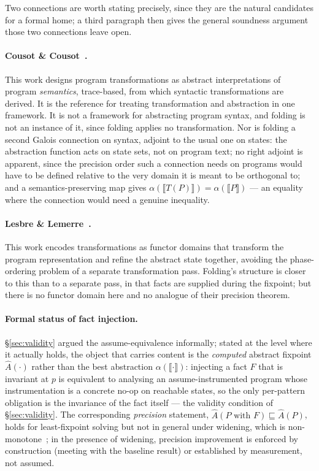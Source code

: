 \documentclass[11pt,a4paper]{article}
\begin{document}
Two connections are worth stating precisely, since they are the natural candidates for a
formal home; a third paragraph then gives the general soundness argument those two
connections leave open.

\paragraph{Cousot \& Cousot~\cite{cousot2002}.} This work designs program transformations
as abstract interpretations of program \emph{semantics}, trace-based, from which
syntactic transformations are derived. It is the reference for treating transformation
and abstraction in one framework. It is not a framework for abstracting program syntax,
and folding is not an instance of it, since folding applies no transformation. Nor is
folding a second Galois connection on syntax, adjoint to the usual one on states: the
abstraction function acts on state sets, not on program text; no right adjoint is
apparent, since the precision order such a connection needs on programs would have to be
defined relative to the very domain it is meant to be orthogonal to; and a
semantics-preserving map gives $\alpha(\llbracket T(P) \rrbracket) =
\alpha(\llbracket P \rrbracket)$ --- an equality where the connection would need a
genuine inequality.

\paragraph{Lesbre \& Lemerre~\cite{lemerre2024}.} This work encodes transformations as
functor domains that transform the program representation and refine the abstract state
together, avoiding the phase-ordering problem of a separate transformation pass.
Folding's structure is closer to this than to a separate pass, in that facts are supplied
during the fixpoint; but there is no functor domain here and no analogue of their
precision theorem.

\paragraph{Formal status of fact injection.}
\label{sec:assume-formal}
\S\ref{sec:validity} argued the assume-equivalence informally; stated at the level where
it actually holds, the object that carries content is the \emph{computed} abstract
fixpoint $\hat{A}(\cdot)$ rather than the best abstraction
$\alpha(\llbracket \cdot \rrbracket)$: injecting a fact $F$ that is invariant at $p$ is
equivalent to analysing an assume-instrumented program whose instrumentation is a
concrete no-op on reachable states, so the only per-pattern obligation is the invariance
of the fact itself --- the validity condition of \S\ref{sec:validity}. The corresponding
\emph{precision} statement, $\hat{A}(P \text{ with } F) \sqsubseteq \hat{A}(P)$, holds
for least-fixpoint solving but not in general under widening, which is
non-monotone~\cite{cousot1992}; in the presence of widening, precision improvement is
enforced by construction (meeting with the baseline result) or established by
measurement, not assumed.
\end{document}
